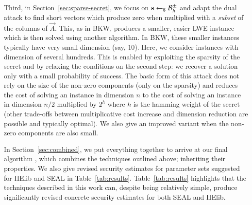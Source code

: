 \documentclass[a4paper]{llncs}
\newcommand{\MYALG}[1][blank]{\ifthenelse{\equal{#1}{blank}}{\textsc{Silke}}{\textsc{Silke}\ensuremath{_{#1}}}\xspace}
\begin{document}
Third, in Section~\ref{sec:sparse-secret}, we focus on \(\s \sample \B[h]{\pm}\) and adapt the dual attack to find short vectors which produce zero when multiplied with a \emph{subset} of the columns of $\vec{A}$. This, as in BKW, produces a smaller, easier LWE instance which is then solved using another algorithm. In BKW, these smaller instances typically have very small dimension (say, $10$). Here, we consider instances with dimension of several hundreds. This is enabled by exploiting the sparsity of the secret and by relaxing the conditions on the second step: we recover a solution only with a small probability of success. The basic form of this attack does not rely on the size of the non-zero components (only on the sparsity) and reduces the cost of solving an instance in dimension \(n\) to the cost of solving an instance in dimension \(n/2\) multiplied by \(2^{h}\) where \(h\) is the hamming weight of the secret (other trade-offs between multiplicative cost increase and dimension reduction are possible and typically optimal). We also give an improved variant when the non-zero components are also small.

In Section~\ref{sec:combined}, we put everything together to arrive at our final algorithm \MYALG, which combines the techniques outlined above; inheriting their properties. We also give revised security estimates for parameter sets suggested for HElib and SEAL in Table~\ref{tab:results}. Table~\ref{tab:results} highlights that the techniques described in this work can, despite being relatively simple, produce significantly revised concrete security estimates for both SEAL and HElib.
\end{document}
